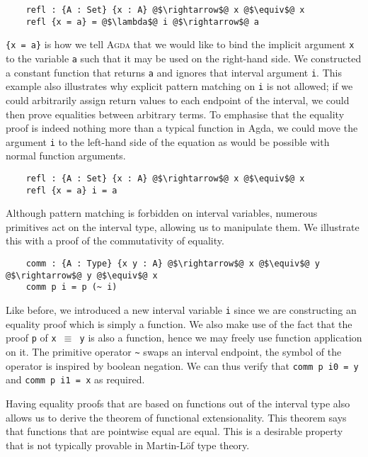 \documentclass[12pt,twoside,maitrise]{dms}
\theoremstyle{definition}
\numberwithin{equation}{section}
\numberwithin{table}{chapter}
\numberwithin{figure}{chapter}
\newcommand\id[1] {\texttt{#1}}
\newcommand\fn[1] {\texttt{#1}}
\def\Agda{\textsc{Agda}\xspace}
\begin{document}
\begin{verbatim}
    refl : {A : Set} {x : A} @$\rightarrow$@ x @$\equiv$@ x
    refl {x = a} = @$\lambda$@ i @$\rightarrow$@ a
\end{verbatim}

\fn{\{x = a\}} is how we tell \Agda{} that we would like to bind the implicit
argument \id{x} to the variable \id{a} such that it may be used on the
right-hand side. We constructed a constant function that returns \id{a} and
ignores that interval argument \id{i}. This example also illustrates why
explicit pattern matching on \id{i} is not allowed; if we could arbitrarily
assign return values to each endpoint of the interval, we could then prove
equalities between arbitrary terms. To emphasise that the equality proof is
indeed nothing more than a typical function in Agda, we could move the argument
\id{i} to the left-hand side of the equation as would be possible with normal
function arguments.

\begin{verbatim}
    refl : {A : Set} {x : A} @$\rightarrow$@ x @$\equiv$@ x
    refl {x = a} i = a
\end{verbatim}

Although pattern matching is forbidden on interval variables, numerous primitives
act on the interval type, allowing us to manipulate them. We illustrate this with
a proof of the commutativity of equality.

\begin{verbatim}
    comm : {A : Type} {x y : A} @$\rightarrow$@ x @$\equiv$@ y @$\rightarrow$@ y @$\equiv$@ x
    comm p i = p (~ i)
\end{verbatim}

Like before, we introduced a new interval variable \id{i} since we are
constructing an equality proof which is simply a function. We also make use of
the fact that the proof \id{p} of \fn{x $\equiv$ y} is also a function, hence we
may freely use function application on it. The primitive operator \id{\~{}}
swaps an interval endpoint, the symbol of the operator is inspired by boolean
negation. We can thus verify that \fn{comm p i0 = y} and \fn{comm p i1 = x} as
required.

Having equality proofs that are based on functions out of the interval type also
allows us to derive the theorem of functional extensionality. This theorem says
that functions that are pointwise equal are equal. This is a desirable property
that is not typically provable in Martin-Löf type
theory\cite{martin1975intuitionistic}.
\end{document}
